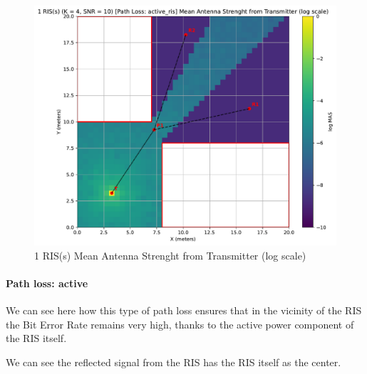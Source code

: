\begin{figure}[H]
  \centering
  \includegraphics[width=0.7\linewidth]{imgs/heatmap-simulations/1 RIS(s) (K = 4, SNR = 10) [Path Loss: active_ris] Mean Antenna Strenght from Transmitter (log scale).pdf}
  \caption{1 RIS(s) Mean Antenna Strenght from Transmitter (log scale)}
\end{figure}

\paragraph*{Path loss: active}

We can see here how this type of path loss ensures that in the vicinity of the RIS the Bit Error Rate remains very high, thanks to the active power component of the RIS itself.

We can see the reflected signal from the RIS has the RIS itself as the center.

